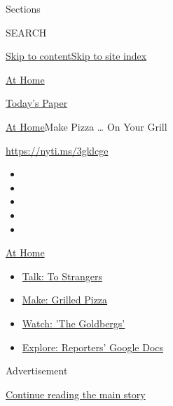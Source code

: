 Sections

SEARCH

\protect\hyperlink{site-content}{Skip to
content}\protect\hyperlink{site-index}{Skip to site index}

\href{https://www.nytimes.com/spotlight/at-home}{At Home}

\href{https://myaccount.nytimes.com/auth/login?response_type=cookie\&client_id=vi}{}

\href{https://www.nytimes.com/section/todayspaper}{Today's Paper}

\href{/spotlight/at-home}{At Home}\textbar{}Make Pizza \ldots{} On Your
Grill

\url{https://nyti.ms/3gklcge}

\begin{itemize}
\item
\item
\item
\item
\item
\end{itemize}

\href{https://www.nytimes.com/spotlight/at-home?action=click\&pgtype=Article\&state=default\&region=TOP_BANNER\&context=at_home_menu}{At
Home}

\begin{itemize}
\tightlist
\item
  \href{https://www.nytimes.com/2020/08/03/well/family/the-benefits-of-talking-to-strangers.html?action=click\&pgtype=Article\&state=default\&region=TOP_BANNER\&context=at_home_menu}{Talk:
  To Strangers}
\item
  \href{https://www.nytimes.com/2020/08/01/at-home/coronavirus-make-pizza-on-a-grill.html?action=click\&pgtype=Article\&state=default\&region=TOP_BANNER\&context=at_home_menu}{Make:
  Grilled Pizza}
\item
  \href{https://www.nytimes.com/2020/07/31/arts/television/goldbergs-abc-stream.html?action=click\&pgtype=Article\&state=default\&region=TOP_BANNER\&context=at_home_menu}{Watch:
  'The Goldbergs'}
\item
  \href{https://www.nytimes.com/interactive/2020/at-home/even-more-reporters-editors-diaries-lists-recommendations.html?action=click\&pgtype=Article\&state=default\&region=TOP_BANNER\&context=at_home_menu}{Explore:
  Reporters' Google Docs}
\end{itemize}

Advertisement

\protect\hyperlink{after-top}{Continue reading the main story}

